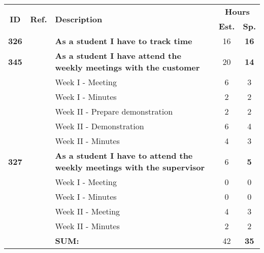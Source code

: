 \label{tab:sprint6storiesProcess}
\def\arraystretch{1.25}
 
\begin{longtable}{ccXcc}

\toprule[0.5mm]
\multirow{2}{*}{\textbf{ID}} &
\multirow{2}{*}{\textbf{Ref.}} & \multirow{2}{*}{\textbf{Description}} & \multicolumn{2}{c}{\textbf{Hours}} \\
 					& & & \textbf{Est.} & \textbf{Sp.} \\

\midrule

\textbf{326} 	&& {\bf  As a student I have to track time} 										& 	16	& \textbf{16} \\
	
\textbf{345} 	&& {\bf As a student I have attend the weekly meetings with the customer} 			& 	20	& \textbf{14} \\
		&& Week I - Meeting							&  6 & 3 \\
		&& Week I - Minutes							&  2 & 2 \\
		&& Week II - Prepare demonstration			&  2 & 2 \\
		&& Week II - Demonstration					&  6 & 4 \\
		&& Week II - Minutes						&  4 & 3 \\


		
\textbf{327} 	&& {\bf As a student I have to attend the weekly meetings with the supervisor} 		& 	6	& \textbf{5} \\
		&& Week I - Meeting							&  0 & 0 \\
		&& Week I - Minutes							&  0 & 0 \\
		&& Week II - Meeting						&  4 & 3 \\
		&& Week II - Minutes						&  2 & 2 \\

				
				
\hline
				&& \textbf{SUM:}		&		42	& \textbf{35}
 \\																			
\bottomrule[0.5mm]
\end{longtable}
